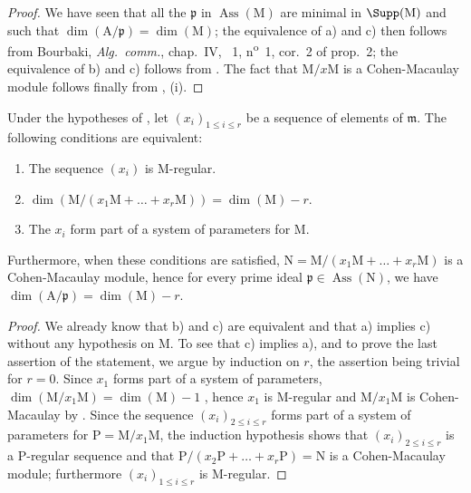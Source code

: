 \begin{proof}
We have seen  that all the $\mathfrak{p}$ in $\operatorname{Ass}(\mathrm{M})$ are minimal in $\Supp(\mathrm{M})$ and such that $\dim(\mathrm{A}/\mathfrak{p})=\dim(\mathrm{M})$; the equivalence of a) and c) then follows from Bourbaki, \emph{Alg.~comm.}, chap.~IV, \textsection~1, n\textsuperscript{o}~1, cor.~2 of prop.~2; the equivalence of b) and c) follows from .
The fact that $\mathrm{M}/x\mathrm{M}$ is a Cohen-Macaulay module follows finally from , (i).
\end{proof}

\begin{corollary}[16.5.6]
\label{0.16.5.6}
Under the hypotheses of , let $(x_i)_{1\leq i\leq r}$ be a sequence of elements of $\mathfrak{m}$.
The following conditions are equivalent:
\begin{enumerate}
  \item[a)] The sequence $(x_i)$ is $\mathrm{M}$-regular.
  \item[b)] $\dim(\mathrm{M}/(x_1\mathrm{M}+\ldots+x_r\mathrm{M}))=\dim(\mathrm{M})-r$.
  \item[c)] The $x_i$ form part of a system of parameters for $\mathrm{M}$.
\end{enumerate}
Furthermore, when these conditions are satisfied, $\mathrm{N}=\mathrm{M}/(x_1\mathrm{M}+\ldots+x_r\mathrm{M})$ is a Cohen-Macaulay module, hence for every prime ideal $\mathfrak{p}\in\operatorname{Ass}(\mathrm{N})$, we have $\dim(\mathrm{A}/\mathfrak{p})=\dim(\mathrm{M})-r$.
\end{corollary}

\begin{proof}
We already know that b) and c) are equivalent  and that a) implies c)  without any hypothesis on $\mathrm{M}$. To see that c) implies a), and to prove the last assertion of the statement, we argue by induction on $r$, the assertion being trivial for $r=0$.
Since $x_1$ forms part of a system of parameters, $\dim(\mathrm{M}/x_1\mathrm{M})=\dim(\mathrm{M})-1$ , hence $x_1$ is $\mathrm{M}$-regular and $\mathrm{M}/x_1\mathrm{M}$ is Cohen-Macaulay by .
Since the sequence $(x_i)_{2\leq i\leq r}$ forms part of a system of parameters for $\mathrm{P}=\mathrm{M}/x_1\mathrm{M}$, the induction hypothesis shows that $(x_i)_{2\leq i\leq r}$ is a $\mathrm{P}$-regular sequence and that $\mathrm{P}/(x_2\mathrm{P}+\ldots+x_r\mathrm{P})=\mathrm{N}$ is a Cohen-Macaulay module; furthermore $(x_i)_{1\leq i\leq r}$ is $\mathrm{M}$-regular.
\end{proof}

